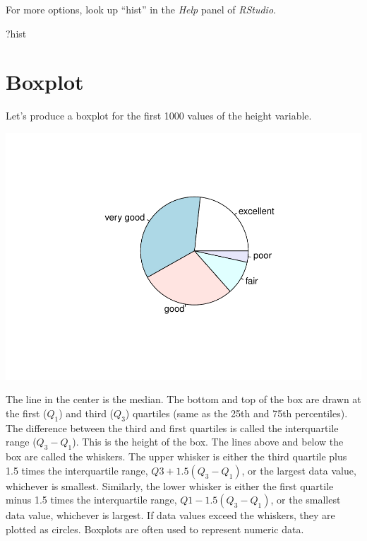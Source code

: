 \documentclass[
]{book}
\newenvironment{Shaded}{\begin{snugshade}}{\end{snugshade}}
\newcommand{\DecValTok}[1]{\textcolor[rgb]{0.00,0.00,0.81}{#1}}
\newcommand{\KeywordTok}[1]{\textcolor[rgb]{0.13,0.29,0.53}{\textbf{#1}}}
\newcommand{\NormalTok}[1]{#1}
\newcommand{\OperatorTok}[1]{\textcolor[rgb]{0.81,0.36,0.00}{\textbf{#1}}}
\begin{document}
For more options, look up ``hist'' in the \emph{Help} panel of \emph{RStudio}.

\begin{Shaded}
\begin{Highlighting}[]
\NormalTok{?hist}
\end{Highlighting}
\end{Shaded}

\hypertarget{boxplot}{%
\section{Boxplot}\label{boxplot}}

Let's produce a boxplot for the first 1000 values of the height variable.

\begin{Shaded}
\end{Shaded}

\includegraphics{_main_files/figure-latex/unnamed-chunk-136-1.pdf}

The line in the center is the median. The bottom and top of the box are drawn at the first (\(Q_1\)) and third (\(Q_3\)) quartiles (same as the 25th and 75th percentiles). The difference between the third and first quartiles is called the interquartile range (\(Q_3-Q_1\)). This is the height of the box. The lines above and below the box are called the whiskers. The upper whisker is either the third quartile plus 1.5 times the interquartile range, \(Q3 +1.5(Q_3-Q_1)\), or the largest data value, whichever is smallest. Similarly, the lower whisker is either the first quartile minus 1.5 times the interquartile range, \(Q1-1.5(Q_3-Q_1)\), or the smallest data value, whichever is largest. If data values exceed the whiskers, they are plotted as circles. Boxplots are often used to represent numeric data.
\end{document}
